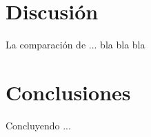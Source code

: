 \documentclass[aps,prl,twocolumn,groupedaddress]{revtex4-2}
\begin{document}
\section{Discusión}

La comparación de ... bla bla bla

\section{Conclusiones}

Concluyendo ...


%



\end{document}
